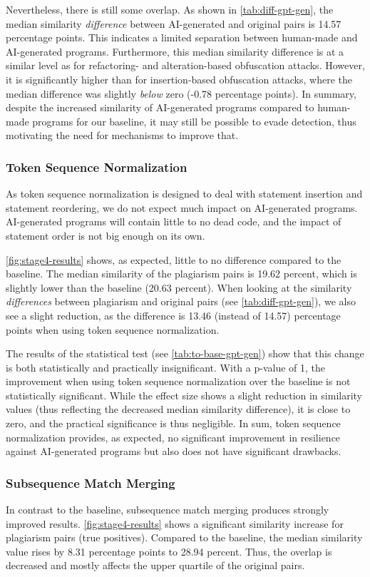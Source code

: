 Nevertheless, there is still some overlap. 
As shown in \autoref{tab:diff-gpt-gen}, the median similarity \textit{difference} between AI-generated and original pairs is 14.57 percentage points. 
This indicates a limited separation between human-made and AI-generated programs. Furthermore, this median similarity difference is at a similar level as for refactoring- and alteration-based obfuscation attacks.
However, it is significantly higher than for insertion-based obfuscation attacks, where the median difference was slightly \textit{below} zero (-0.78 percentage points).
In summary, despite the increased similarity of AI-generated programs compared to human-made programs for our baseline, it may still be possible to evade detection, thus motivating the need for mechanisms to improve that.

\subsubsection{Token Sequence Normalization}
As token sequence normalization is designed to deal with statement insertion and statement reordering, we do not expect much impact on AI-generated programs.
AI-generated programs will contain little to no dead code, and the impact of statement order is not big enough on its own.

\autoref{fig:stage4-results} shows, as expected, little to no difference compared to the baseline.
The median similarity of the plagiarism pairs is 19.62 percent, which is slightly lower than the baseline (20.63 percent).
When looking at the similarity \textit{differences} between plagiarism and original pairs (see \autoref{tab:diff-gpt-gen}), we also see a slight reduction, as the difference is 13.46 (instead of 14.57) percentage points when using token sequence normalization.

The results of the statistical test (see \autoref{tab:to-base-gpt-gen}) show that this change is both statistically and practically insignificant.
With a p-value of 1, the improvement when using token sequence normalization over the baseline is not statistically significant.
While the effect size shows a slight reduction in similarity values (thus reflecting the decreased median similarity difference), it is close to zero, and the practical significance is thus negligible.
In sum, token sequence normalization provides, as expected, no significant improvement in resilience against AI-generated programs but also does not have significant drawbacks.

\subsubsection{Subsequence Match Merging}
In contrast to the baseline, subsequence match merging produces strongly improved results.
\autoref{fig:stage4-results} shows a significant similarity increase for plagiarism pairs (true positives).
Compared to the baseline, the median similarity value rises by 8.31 percentage points to 28.94 percent.
Thus, the overlap is decreased and mostly affects the upper quartile of the original pairs.

